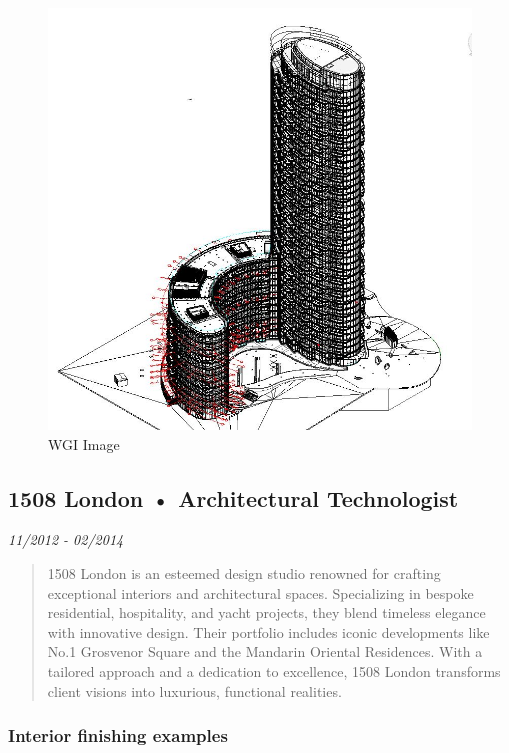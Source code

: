 \documentclass[
]{article}
\begin{document}
\begin{figure}[H]

{\centering \includegraphics{assets/WGI/WGI-OtherHohusing.JPG}

}

\caption{WGI Image}

\end{figure}%

\subsection{1508 London • Architectural
Technologist}\label{london-architectural-technologist}

\emph{11/2012 - 02/2014}

\begin{quote}
1508 London is an esteemed design studio renowned for crafting
exceptional interiors and architectural spaces. Specializing in bespoke
residential, hospitality, and yacht projects, they blend timeless
elegance with innovative design. Their portfolio includes iconic
developments like No.1 Grosvenor Square and the Mandarin Oriental
Residences. With a tailored approach and a dedication to excellence,
1508 London transforms client visions into luxurious, functional
realities.
\end{quote}

\subsubsection{Interior finishing
examples}\label{interior-finishing-examples}
\end{document}
